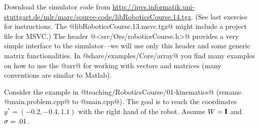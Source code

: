 





Download the simulator code from
{\tiny\url{http://ipvs.informatik.uni-stuttgart.de/mlr/marc/source-code/libRoboticsCourse.14.tgz}}. (See
last exercise for instructions. The @libRoboticsCourse.13.msvc.tgz@
might include a project file for MSVC.)  The header
@<src/Ors/roboticsCourse.h>@ provides a very simple interface to the
simulator---we will use only this header and some generic matrix
functionalities. In @share/examples/Core/array@ you find many examples
on how to use the @arr@ for working with vectors and matrices (many
conventions are similar to Matlab).

Consider the example in @teaching/RoboticsCourse/01-kinematics@
(rename @main.problem.cpp@ to @main.cpp@). The goal is to reach the
coordinates $y^*=(-0.2, -0.4, 1.1)$ with the right hand of the
robot. Assume $W={\rm\bf I}$ and $\sigma=.01$.

